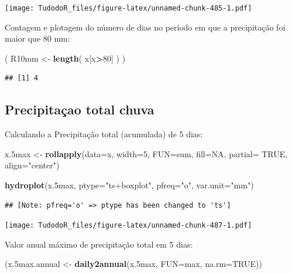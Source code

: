\documentclass[
]{book}
\newenvironment{Shaded}{\begin{snugshade}}{\end{snugshade}}
\newcommand{\DataTypeTok}[1]{\textcolor[rgb]{0.13,0.29,0.53}{#1}}
\newcommand{\DecValTok}[1]{\textcolor[rgb]{0.00,0.00,0.81}{#1}}
\newcommand{\FloatTok}[1]{\textcolor[rgb]{0.00,0.00,0.81}{#1}}
\newcommand{\KeywordTok}[1]{\textcolor[rgb]{0.13,0.29,0.53}{\textbf{#1}}}
\newcommand{\NormalTok}[1]{#1}
\newcommand{\OperatorTok}[1]{\textcolor[rgb]{0.81,0.36,0.00}{\textbf{#1}}}
\newcommand{\OtherTok}[1]{\textcolor[rgb]{0.56,0.35,0.01}{#1}}
\newcommand{\StringTok}[1]{\textcolor[rgb]{0.31,0.60,0.02}{#1}}
\begin{document}
\texttt{[image: TudodoR\_files/figure-latex/unnamed-chunk-485-1.pdf]}

Contagem e plotagem do número de dias no período em que a precipitação foi maior que 80 mm:

\begin{Shaded}
\begin{Highlighting}[]
\NormalTok{( R10mm <-}\StringTok{ }\KeywordTok{length}\NormalTok{( x[x}\OperatorTok{>}\DecValTok{80}\NormalTok{] ) )}
\end{Highlighting}
\end{Shaded}

\begin{verbatim}
## [1] 4
\end{verbatim}

\hypertarget{precipitauxe7ao-total-chuva}{%
\subsection{Precipitaçao total chuva}\label{precipitauxe7ao-total-chuva}}

Calculando a Precipitação total (acumulada) de 5 dias:

\begin{Shaded}
\begin{Highlighting}[]
\NormalTok{x}\FloatTok{.5}\NormalTok{max <-}\StringTok{ }\KeywordTok{rollapply}\NormalTok{(}\DataTypeTok{data=}\NormalTok{x, }\DataTypeTok{width=}\DecValTok{5}\NormalTok{, }\DataTypeTok{FUN=}\NormalTok{sum, }\DataTypeTok{fill=}\OtherTok{NA}\NormalTok{, }\DataTypeTok{partial=} \OtherTok{TRUE}\NormalTok{,}
\DataTypeTok{align=}\StringTok{"center"}\NormalTok{)}

\KeywordTok{hydroplot}\NormalTok{(x}\FloatTok{.5}\NormalTok{max, }\DataTypeTok{ptype=}\StringTok{"ts+boxplot"}\NormalTok{, }\DataTypeTok{pfreq=}\StringTok{"o"}\NormalTok{, }\DataTypeTok{var.unit=}\StringTok{"mm"}\NormalTok{)}
\end{Highlighting}
\end{Shaded}

\begin{verbatim}
## [Note: pfreq='o' => ptype has been changed to 'ts']
\end{verbatim}

\texttt{[image: TudodoR\_files/figure-latex/unnamed-chunk-487-1.pdf]}

Valor anual máximo de precipitação total em 5 dias:

\begin{Shaded}
\begin{Highlighting}[]
\NormalTok{(x}\FloatTok{.5}\NormalTok{max.annual <-}\StringTok{ }\KeywordTok{daily2annual}\NormalTok{(x}\FloatTok{.5}\NormalTok{max, }\DataTypeTok{FUN=}\NormalTok{max, }\DataTypeTok{na.rm=}\OtherTok{TRUE}\NormalTok{))}
\end{Highlighting}
\end{Shaded}
\end{document}

